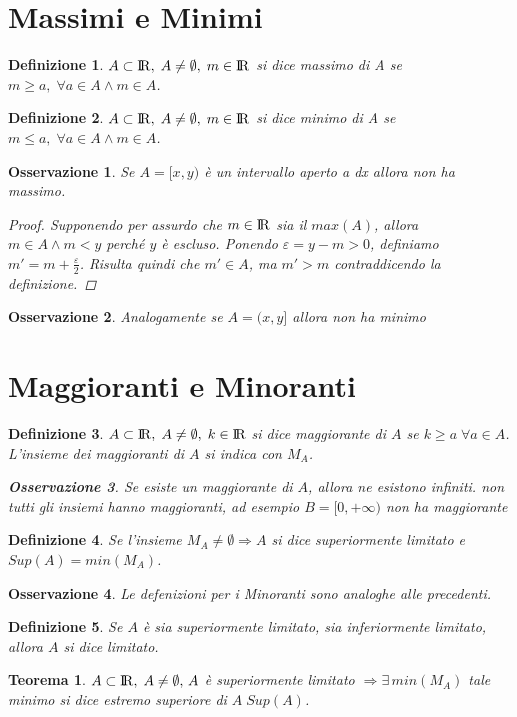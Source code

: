 \documentclass[12pt, a4paper]{article}
\theoremstyle{break}
\newtheorem{theorem}{Teorema}[subsection]
\newtheorem{definition}{Definizione}[subsection]
\newtheorem{observation}{Osservazione}[subsection]
\newcommand\R{{\rm I\!R}}
\begin{document}
    \section{Massimi e Minimi}
    \begin{definition}
        $A\subset\R,\; A\neq\emptyset,\; m\in\R$ si dice massimo di A se $m\geq a,\; \forall a\in A \wedge m \in A$.
    \end{definition}
    \begin{definition}
        $A\subset\R,\; A\neq\emptyset,\; m\in\R$ si dice minimo di A se $m\leq a,\; \forall a\in A \wedge m \in A$. 
    \end{definition}
    \begin{observation}
        Se $A = [x,y)$ è un intervallo aperto a dx allora non ha massimo.
        \begin{proof}
            Supponendo per assurdo che $m\in\R$ sia il $max(A)$, allora $m\in A \wedge m<y$ perché $y$ è escluso.\newline
            Ponendo $\varepsilon = y-m > 0$, definiamo $m' = m + \frac{\varepsilon}{2}$.\newline 
            Risulta quindi che $m' \in A$, ma $m' > m$ contraddicendo la definizione.
        \end{proof}
    \end{observation}
    \begin{observation}
        Analogamente se $A = (x,y]$ allora non ha minimo
    \end{observation}
    \section{Maggioranti e Minoranti}
    \begin{definition}
        $A\subset\R,\; A\neq\emptyset,\; k\in\R$ si dice maggiorante di $A$ se $k\geq a\; \forall a \in A$. L'insieme dei maggioranti di $A$ si indica con $M_A$.
        \begin{observation}
            Se esiste un maggiorante di $A$, allora ne esistono infiniti.\newline
            non tutti gli insiemi hanno maggioranti, ad esempio $B = [0,+\infty)$ non ha maggiorante
        \end{observation}
    \end{definition}
    \begin{definition}
        Se l'insieme $M_A\neq\emptyset\Rightarrow A$ si dice superiormente limitato e $Sup(A) = min(M_A)$. 
    \end{definition}
    \begin{observation}
        Le defenizioni per i Minoranti sono analoghe alle precedenti.
    \end{observation}
    \begin{definition}
    Se $A$ è sia superiormente limitato, sia inferiormente limitato, allora $A$ si dice limitato.
    \end{definition}
    \begin{theorem}
        $A\subset\R,\; A\neq\emptyset,\, A$ è superiormente limitato $\Rightarrow\exists\, min(M_A)$ tale minimo si dice estremo superiore di $A\; Sup(A)$.
    \end{theorem}
\end{document}
